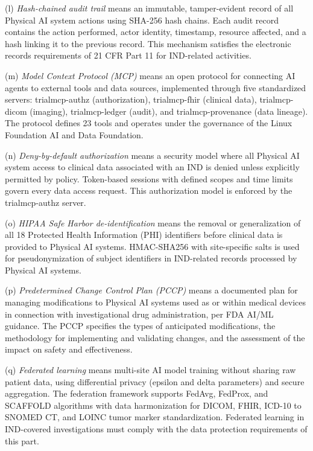 \documentclass[11pt]{article}
\begin{document}
(l) \textit{Hash-chained audit trail} means an immutable, tamper-evident record of all Physical AI system actions using SHA-256 hash chains. Each audit record contains the action performed, actor identity, timestamp, resource affected, and a hash linking it to the previous record. This mechanism satisfies the electronic records requirements of 21 CFR Part 11 for IND-related activities.

(m) \textit{Model Context Protocol (MCP)} means an open protocol for connecting AI agents to external tools and data sources, implemented through five standardized servers: trialmcp-authz (authorization), trialmcp-fhir (clinical data), trialmcp-dicom (imaging), trialmcp-ledger (audit), and trialmcp-provenance (data lineage). The protocol defines 23 tools and operates under the governance of the Linux Foundation AI and Data Foundation.

(n) \textit{Deny-by-default authorization} means a security model where all Physical AI system access to clinical data associated with an IND is denied unless explicitly permitted by policy. Token-based sessions with defined scopes and time limits govern every data access request. This authorization model is enforced by the trialmcp-authz server.

(o) \textit{HIPAA Safe Harbor de-identification} means the removal or generalization of all 18 Protected Health Information (PHI) identifiers before clinical data is provided to Physical AI systems. HMAC-SHA256 with site-specific salts is used for pseudonymization of subject identifiers in IND-related records processed by Physical AI systems.

(p) \textit{Predetermined Change Control Plan (PCCP)} means a documented plan for managing modifications to Physical AI systems used as or within medical devices in connection with investigational drug administration, per FDA AI/ML guidance. The PCCP specifies the types of anticipated modifications, the methodology for implementing and validating changes, and the assessment of the impact on safety and effectiveness.

(q) \textit{Federated learning} means multi-site AI model training without sharing raw patient data, using differential privacy (epsilon and delta parameters) and secure aggregation. The federation framework supports FedAvg, FedProx, and SCAFFOLD algorithms with data harmonization for DICOM, FHIR, ICD-10 to SNOMED CT, and LOINC tumor marker standardization. Federated learning in IND-covered investigations must comply with the data protection requirements of this part.
\end{document}
